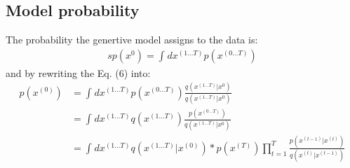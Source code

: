 \documentclass{article}
\begin{document}
\subsection*{Model probability}
The probability the genertive model assigns to the data is:
\begin{gather}s
p(x^{0}) = \int_{}{}dx^{(1...T)}p(x^{(0...T)})
\end{gather}
and by rewriting the Eq. (6) into:
\begin{equation}
    \begin{split}
        p(x^{(0)}) &= \int_{}{}dx^{(1...T)}p(x^{(0...T)})\frac{q(x^{(1...T)}|x^{0})}{q(x^{(1...T)}|x^{0})}\\
        &= \int_{}{}dx^{(1...T)}q(x^{(1...T)})\frac{p(x^{(0...T)})}{q(x^{(1...T)}|x^{0})}\\ 
        &= \int_{}{}dx^{(1...T)}q(x^{(1...T)}|x^{(0)})*p(x^{(T)})\prod_{t=1}^{T}\frac{p(x^{(t-1)}|x^{(t)})}{q(x^{(t)}|x^{(t-1)})}
    \end{split}    
\end{equation}
\end{document}
